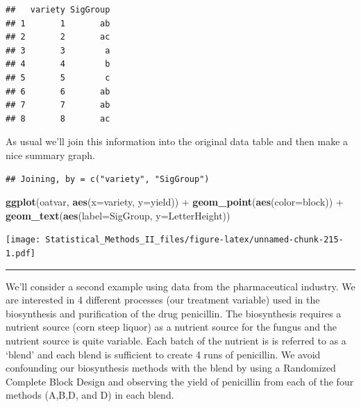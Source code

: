 \documentclass[]{book}
\newenvironment{Shaded}{\begin{snugshade}}{\end{snugshade}}
\newcommand{\KeywordTok}[1]{\textcolor[rgb]{0.13,0.29,0.53}{\textbf{{#1}}}}
\newcommand{\DataTypeTok}[1]{\textcolor[rgb]{0.13,0.29,0.53}{{#1}}}
\newcommand{\DecValTok}[1]{\textcolor[rgb]{0.00,0.00,0.81}{{#1}}}
\newcommand{\FloatTok}[1]{\textcolor[rgb]{0.00,0.00,0.81}{{#1}}}
\newcommand{\StringTok}[1]{\textcolor[rgb]{0.31,0.60,0.02}{{#1}}}
\newcommand{\NormalTok}[1]{{#1}}
\theoremstyle{definition}
\theoremstyle{definition}
\theoremstyle{remark}
\begin{document}
\begin{verbatim}
##   variety SigGroup
## 1       1       ab
## 2       2       ac
## 3       3        a
## 4       4        b
## 5       5        c
## 6       6       ab
## 7       7       ab
## 8       8       ac
\end{verbatim}

As usual we'll join this information into the original data table and
then make a nice summary graph.

\begin{Shaded}
\end{Shaded}

\begin{verbatim}
## Joining, by = c("variety", "SigGroup")
\end{verbatim}

\begin{Shaded}
\begin{Highlighting}[]
\KeywordTok{ggplot}\NormalTok{(oatvar, }\KeywordTok{aes}\NormalTok{(}\DataTypeTok{x=}\NormalTok{variety, }\DataTypeTok{y=}\NormalTok{yield)) +}
\StringTok{  }\KeywordTok{geom_point}\NormalTok{(}\KeywordTok{aes}\NormalTok{(}\DataTypeTok{color=}\NormalTok{block)) +}
\StringTok{  }\KeywordTok{geom_text}\NormalTok{(}\KeywordTok{aes}\NormalTok{(}\DataTypeTok{label=}\NormalTok{SigGroup, }\DataTypeTok{y=}\NormalTok{LetterHeight))}
\end{Highlighting}
\end{Shaded}

\texttt{[image: Statistical\_Methods\_II\_files/figure-latex/unnamed-chunk-215-1.pdf]}

\begin{center}\rule{0.5\linewidth}{\linethickness}\end{center}

We'll consider a second example using data from the pharmaceutical
industry. We are interested in 4 different processes (our treatment
variable) used in the biosynthesis and purification of the drug
penicillin. The biosynthesis requires a nutrient source (corn steep
liquor) as a nutrient source for the fungus and the nutrient source is
quite variable. Each batch of the nutrient is is referred to as a
`blend' and each blend is sufficient to create 4 runs of penicillin. We
avoid confounding our biosynthesis methods with the blend by using a
Randomized Complete Block Design and observing the yield of penicillin
from each of the four methods (A,B,D, and D) in each blend.
\end{document}
